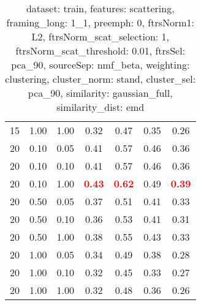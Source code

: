 \begin{table}
\begin{center}
\begin{tabular}{lllcccc}
15 & 1.00 & 1.00 & 0.32 & 0.47 & 0.35 & 0.26 \\ 
20 & 0.10 & 0.05 & 0.41 & 0.57 & 0.46 & 0.36 \\ 
20 & 0.10 & 0.10 & 0.41 & 0.57 & 0.46 & 0.36 \\ 
20 & 0.10 & 1.00 & \textbf{\textcolor{red}{0.43}} & \textbf{\textcolor{red}{0.62}} & 0.49 & \textbf{\textcolor{red}{0.39}} \\ 
20 & 0.50 & 0.05 & 0.37 & 0.51 & 0.41 & 0.33 \\ 
20 & 0.50 & 0.10 & 0.36 & 0.53 & 0.41 & 0.31 \\ 
20 & 0.50 & 1.00 & 0.38 & 0.55 & 0.43 & 0.33 \\ 
20 & 1.00 & 0.05 & 0.34 & 0.49 & 0.38 & 0.28 \\ 
20 & 1.00 & 0.10 & 0.32 & 0.45 & 0.33 & 0.27 \\ 
20 & 1.00 & 1.00 & 0.32 & 0.48 & 0.36 & 0.26 \\ 
\end{tabular} 
\end{center} 
\caption{dataset: train, features: scattering, framing\_long: 1\_1, preemph: 0, ftrsNorm1: L2, ftrsNorm\_scat\_selection: 1, ftrsNorm\_scat\_threshold: 0.01, ftrsSel: pca\_90, sourceSep: nmf\_beta, weighting: clustering, cluster\_norm: stand, cluster\_sel: pca\_90, similarity: gaussian\_full, similarity\_dist: emd} 
\label{datasetrFeaturscFraminlong1_1Preemp0Ftrsnorm1L2Ftrsnoscatselect1Ftrsnoscatthresh0.01Ftrsselpc90SourcesepnmbeWeightclClustenormstClusteselpc90SimilagafuSimiladistem} 
\end{table} 
 
